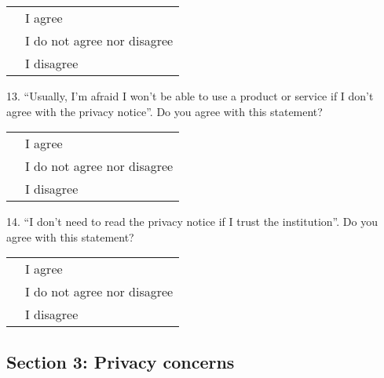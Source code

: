 \vspace{0.6cm}
\begin{center}
    \noindent\begin{tabularx}{0.8\textwidth}{ >{\centering\arraybackslash}X >{\raggedright\arraybackslash}X }
        {\huge $\circ$} & I agree \\[0.2cm]
        {\huge $\circ$} & I do not agree nor disagree \\[0.2cm]
        {\huge $\circ$} & I disagree
    \end{tabularx}
\end{center}
\vspace{0.6cm}

13. ``Usually, I'm afraid I won't be able to use a product or service if I don't agree with the privacy notice''. Do you agree with this statement?

\vspace{0.6cm}
\begin{center}
    \noindent\begin{tabularx}{0.8\textwidth}{ >{\centering\arraybackslash}X >{\raggedright\arraybackslash}X }
        {\huge $\circ$} & I agree \\[0.2cm]
        {\huge $\circ$} & I do not agree nor disagree \\[0.2cm]
        {\huge $\circ$} & I disagree
    \end{tabularx}
\end{center}
\vspace{0.6cm}

14. ``I don't need to read the privacy notice if I trust the institution''. Do you agree with this statement?

\vspace{0.6cm}
\begin{center}
    \noindent\begin{tabularx}{0.8\textwidth}{ >{\centering\arraybackslash}X >{\raggedright\arraybackslash}X }
        {\huge $\circ$} & I agree \\[0.2cm]
        {\huge $\circ$} & I do not agree nor disagree \\[0.2cm]
        {\huge $\circ$} & I disagree
    \end{tabularx}
\end{center}
\vspace{0.6cm}

\subsection*{Section 3: Privacy concerns}

